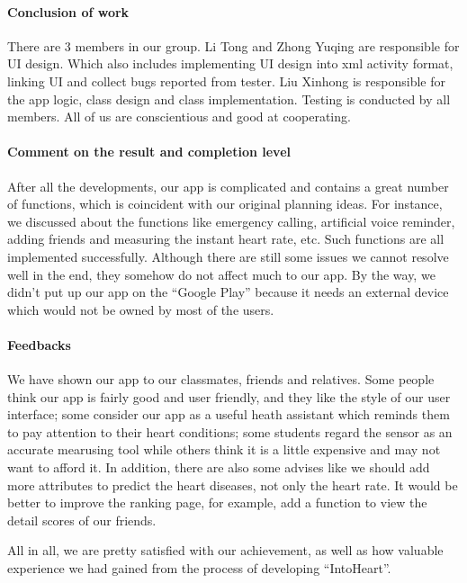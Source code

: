 \paragraph{Conclusion of work}
There are 3 members in our group. Li Tong and Zhong Yuqing are responsible for UI design. Which also includes implementing UI design into xml activity format, linking UI and collect bugs reported from tester. Liu Xinhong is responsible for the app logic, class design and class implementation. Testing is conducted by all members.  All of us are conscientious and good at cooperating. 
                                
\paragraph{Comment on the result and completion level}
After all the developments, our app is complicated and contains a great number of functions, which is coincident with our original planning ideas. For instance, we discussed about the functions like emergency calling, artificial voice reminder, adding friends and measuring the instant heart rate, etc. Such functions are all implemented successfully. Although there are still some issues we cannot resolve well in the end,  they somehow do not affect much to our app. By the way, we didn’t put up our app on the “Google Play” because it needs an external device which would not be owned by most of the users.  
 
\paragraph{Feedbacks}
We have shown our app to our classmates, friends and relatives. Some people think our app is fairly good and user friendly, and they like the style of our user interface; some consider our app as a useful heath assistant which reminds them to pay attention to their heart conditions; some students regard the sensor as an accurate mearusing tool while others think it is a little expensive and may not want to afford it. In addition, there are also some advises like we should add more attributes to predict the heart diseases, not only the heart rate. It would be better to improve the ranking page, for example, add a function to view the detail scores of our friends. 

All in all, we are pretty satisfied with our achievement, as well as how valuable experience we had gained from the process of developing “IntoHeart”. 
